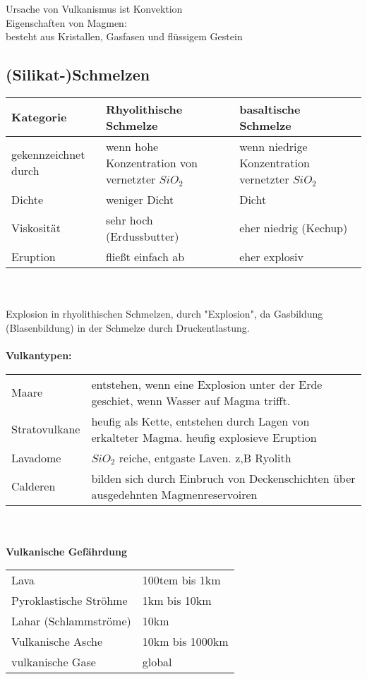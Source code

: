 \documentclass[a4,12pt]{scrreprt}
\begin{document}
Ursache von Vulkanismus ist Konvektion\\
Eigenschaften von Magmen:\\
besteht aus Kristallen, Gasfasen und flüssigem Gestein\\
\subsection{(Silikat-)Schmelzen}
\begin{tabular}{l|ll}
Kategorie & Rhyolithische Schmelze & basaltische Schmelze\\
\hline
gekennzeichnet durch & wenn hohe Konzentration von vernetzter $SiO_2$ & wenn niedrige Konzentration vernetzter $SiO_2$\\
Dichte & weniger Dicht & Dicht\\
Viskosität & sehr hoch (Erdussbutter) & eher niedrig (Kechup)\\
Eruption & fließt einfach ab & eher explosiv\\
\end{tabular}\\
\\
Explosion in rhyolithischen Schmelzen, durch "Explosion", da Gasbildung (Blasenbildung) in der Schmelze durch Druckentlastung.\\
\\
\textbf{Vulkantypen:}\\
\begin{tabular}{l|l}
Maare & entstehen, wenn eine Explosion unter der Erde geschiet, wenn Wasser auf Magma trifft.\\
Stratovulkane & heufig als Kette, entstehen durch Lagen von erkalteter Magma. heufig explosieve Eruption\\
Lavadome & $SiO_2$ reiche, entgaste Laven. z,B Ryolith\\
Calderen & bilden sich durch Einbruch von Deckenschichten über ausgedehnten Magmenreservoiren\\
\end{tabular}\\
\\
\textbf{Vulkanische Gefährdung}\\
\begin{tabular}{l|l}
Lava & 100tem bis 1km\\
Pyroklastische Ströhme & 1km bis 10km\\
Lahar (Schlammströme) & 10km\\
Vulkanische Asche & 10km bis 1000km\\
vulkanische Gase & global\\
\end{tabular}
\end{document}
